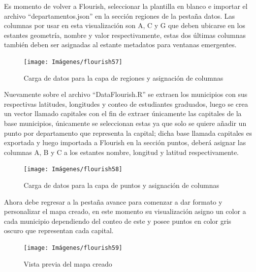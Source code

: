 \documentclass[
]{book}
\begin{document}
Es momento de volver a Flourish, seleccionar la plantilla en blanco e importar el archivo ``departamentos.json'' en la sección regiones de la pestaña datos. Las columnas por usar en esta visualización son A, C y G que deben ubicarse en los estantes geometría, nombre y valor respectivamente, estas dos últimas columnas también deben ser asignadas al estante metadatos para ventanas emergentes.

\begin{figure}

{\centering \texttt{[image: Imágenes/flourish57]} 

}

\caption{Carga de datos para la capa de regiones y asignación de columnas}\label{fig:regionesmapadeptosflourish-fig}
\end{figure}

Nuevamente sobre el archivo ``DataFlourish.R'' se extraen los municipios con sus respectivas latitudes, longitudes y conteo de estudiantes graduados, luego se crea un vector llamado capitales con el fin de extraer únicamente las capitales de la base municipios, únicamente se seleccionan estas ya que solo se quiere añadir un punto por departamento que representa la capital; dicha base llamada capitales es exportada y luego importada a Flourish en la sección puntos, deberá asignar las columnas A, B y C a los estantes nombre, longitud y latitud respectivamente.

\begin{figure}

{\centering \texttt{[image: Imágenes/flourish58]} 

}

\caption{Carga de datos para la capa de puntos y asignación de columnas}\label{fig:puntosmapadeptosflourish-fig}
\end{figure}

Ahora debe regresar a la pestaña avance para comenzar a dar formato y personalizar el mapa creado, en este momento su visualización asigno un color a cada municipio dependiendo del conteo de este y posee puntos en color gris oscuro que representan cada capital.

\begin{figure}

{\centering \texttt{[image: Imágenes/flourish59]} 

}

\caption{Vista previa del mapa creado}\label{fig:vistapreviamapadeptosflourish-fig}
\end{figure}
\end{document}
